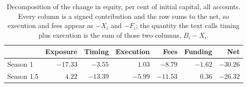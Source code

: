 \begin{table}[ht]
\centering
\small
\caption{Decomposition of the change in equity, per cent of initial capital, all accounts. Every column is a signed contribution and the row sums to the net, so execution and fees appear as $-X_i$ and $-F_i$; the quantity the text calls timing plus execution is the sum of those two columns, $B_i-X_i$.}
\label{tab:pnl}
\begin{tabular}{lrrrrrr}
\toprule
 & Exposure & Timing & Execution & Fees & Funding & Net \\
\midrule
Season 1 & $-17.33$ & $-3.55$ & $1.03$ & $-8.79$ & $-1.62$ & $-30.26$ \\
Season 1.5 & $4.22$ & $-13.39$ & $-5.99$ & $-11.53$ & $0.36$ & $-26.32$ \\
\bottomrule
\end{tabular}
\end{table}
